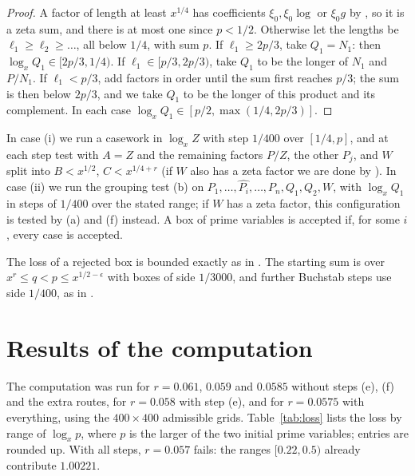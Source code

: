 \documentclass[11pt]{amsart}
\theoremstyle{definition}
\theoremstyle{remark}
\newcommand{\rz}{\RZERO}
\newcommand{\RZERO}{0.0575}
\newcommand{\J}{\cite{J}}
\begin{document}
\begin{proof}
A factor of length at least $x^{1/4}$ has coefficients $\xi_0,\xi_0\log$ or $\xi_0 g$ by \cite[Information~4.15]{J}, so it is a zeta sum, and there is at most one since $p<1/2$. Otherwise let the lengths be $\ell_1\ge\ell_2\ge\dots$, all below $1/4$, with sum $p$. If $\ell_1\ge 2p/3$, take $Q_1=N_1$: then $\log_xQ_1\in[2p/3,1/4)$. If $\ell_1\in[p/3,2p/3)$, take $Q_1$ to be the longer of $N_1$ and $P/N_1$. If $\ell_1<p/3$, add factors in order until the sum first reaches $p/3$; the sum is then below $2p/3$, and we take $Q_1$ to be the longer of this product and its complement. In each case $\log_xQ_1\in[p/2,\max(1/4,2p/3)]$.
\end{proof}

In case (i) we run a casework in $\log_xZ$ with step $1/400$ over $[1/4,p]$, and at each step test \cite[Proposition~6.1(iii)]{J} with $A=Z$ and the remaining factors $P/Z$, the other $P_j$, and $W$ split into $B<x^{1/2}$, $C<x^{1/4+r}$ (if $W$ also has a zeta factor we are done by \cite[Lemma~5.9]{J}). In case (ii) we run the grouping test (b) on $P_1,\dots,\widehat{P_i},\dots,P_n,Q_1,Q_2,W$, with $\log_xQ_1$ in steps of $1/400$ over the stated range; if $W$ has a zeta factor, this configuration is tested by (a) and (f) instead. A box of prime variables is accepted if, for some $i$, every case is accepted.

The loss of a rejected box is bounded exactly as in \cite[(7.6)--(7.7)]{J}. The starting sum is over $x^{r}\le q<p\le x^{1/2-\epsilon}$ with boxes of side $1/3000$, and further Buchstab steps use side $1/400$, as in \J{}.

\section{Results of the computation}

The computation was run for $r=0.061$, $0.059$ and $0.0585$ without steps (e), (f) and the extra routes, for $r=0.058$ with step (e), and for $r=\rz$ with everything, using the $400\times400$ admissible grids. Table~\ref{tab:loss} lists the loss by range of $\log_xp$, where $p$ is the larger of the two initial prime variables; entries are rounded up. With all steps, $r=0.057$ fails: the ranges $[0.22,0.5)$ already contribute $1.00221$.
\end{document}
